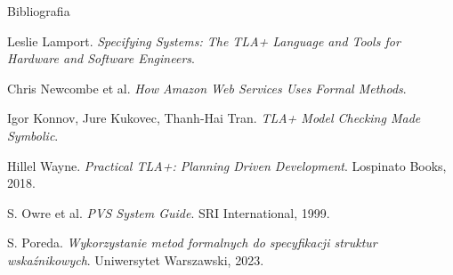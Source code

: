 \documentclass{beamer}
\begin{document}
\begin{frame}{Bibliografia}
\begin{thebibliography}{9}
  Leslie Lamport. 
  \emph{Specifying Systems: The TLA+ Language and Tools for Hardware and Software Engineers}. 

  Chris Newcombe et al. 
  \emph{How Amazon Web Services Uses Formal Methods}. 
  
  Igor Konnov, Jure Kukovec, Thanh-Hai Tran. 
  \emph{TLA+ Model Checking Made Symbolic}. 
  
  Hillel Wayne. 
  \emph{Practical TLA+: Planning Driven Development}. 
  Lospinato Books, 2018. 
  
  S. Owre et al. 
  \emph{PVS System Guide}. 
  SRI International, 1999.
  
  S. Poreda. 
  \emph{Wykorzystanie metod formalnych do specyfikacji struktur wskaźnikowych}. 
  Uniwersytet Warszawski, 2023.
\end{thebibliography}
\end{frame}
\end{document}
